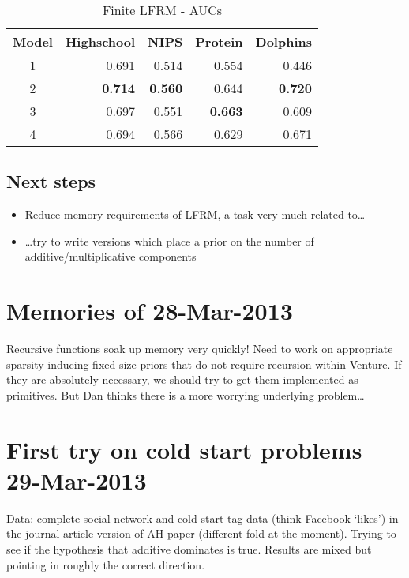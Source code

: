 \documentclass[twoside,11pt]{article}
\begin{document}
\begin{table*}[ht!]
\caption{{\small
Finite LFRM - AUCs
}}
\label{tbl:LFRM 26-Mar-2013}
\begin{center}
\begin{tabular}{c | r r r r}
Model & Highschool & NIPS & Protein & Dolphins \\
\hline
1 & 0.691 & 0.514 & 0.554 & 0.446 \\
2 & \textbf{0.714} & \textbf{0.560} & 0.644 & \textbf{0.720} \\
3 & 0.697 & 0.551 & \textbf{0.663} & 0.609 \\
4 & 0.694 & 0.566 & 0.629 & 0.671
\end{tabular}
\end{center}
\end{table*}

\subsection{Next steps}

\begin{itemize}
\item Reduce memory requirements of LFRM, a task very much related to\ldots
\item \ldots try to write versions which place a prior on the number of additive/multiplicative components
\end{itemize}

\section{Memories of 28-Mar-2013}

Recursive functions soak up memory very quickly!
Need to work on appropriate sparsity inducing fixed size priors that do not require recursion within Venture.
If they are absolutely necessary, we should try to get them implemented as primitives.
But Dan thinks there is a more worrying underlying problem\ldots

\section{First try on cold start problems 29-Mar-2013}

Data: complete social network and cold start tag data (think Facebook `likes') in the journal article version of AH paper (different fold at the moment).
Trying to see if the hypothesis that additive dominates is true.
Results are mixed but pointing in roughly the correct direction.
\end{document}
